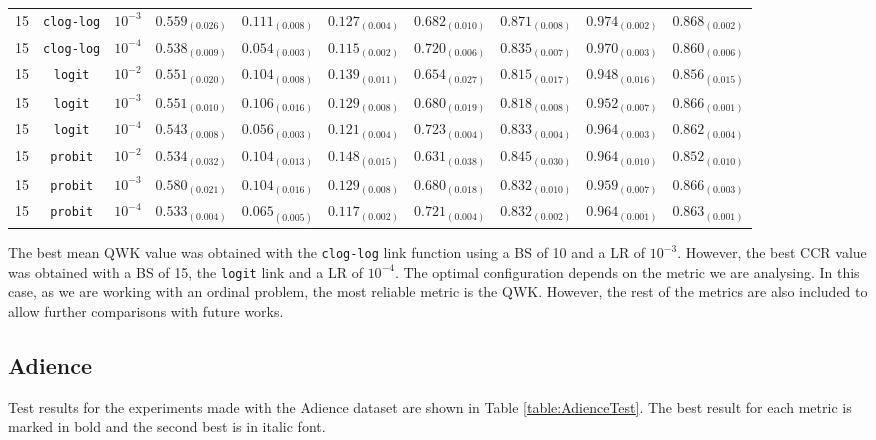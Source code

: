 \documentclass[journal]{IEEEtran}
\begin{document}
\begin{table}[!t]
\begin{tabular}{c@{\hskip 0.15cm}c@{\hskip 0.15cm}c@{\hskip 0.15cm}c@{\hskip 0.30cm}c@{\hskip 0.20cm}c@{\hskip 0.20cm}c@{\hskip 0.20cm}c@{\hskip 0.20cm}c@{\hskip 0.20cm}c}
			15 & \texttt{clog-log} & $10^{-3}$ & $0.559_{(0.026)}$ & $\mathit{0.111_{(0.008)}}$ & $0.127_{(0.004)}$ & $0.682_{(0.010)}$ & $0.871_{(0.008)}$ & $\mathit{0.974_{(0.002)}}$ & $\mathbf{0.868_{(0.002)}}$\\
			15 & \texttt{clog-log} & $10^{-4}$ & $0.538_{(0.009)}$ & $0.054_{(0.003)}$ & $\mathbf{0.115_{(0.002)}}$ & $0.720_{(0.006)}$ & $0.835_{(0.007)}$ & $0.970_{(0.003)}$ & $0.860_{(0.006)}$\\
			15 & \texttt{logit} & $10^{-2}$ & $0.551_{(0.020)}$ & $0.104_{(0.008)}$ & $0.139_{(0.011)}$ & $0.654_{(0.027)}$ & $0.815_{(0.017)}$ & $0.948_{(0.016)}$ & $0.856_{(0.015)}$\\
			15 & \texttt{logit} & $10^{-3}$ & $0.551_{(0.010)}$ & $0.106_{(0.016)}$ & $0.129_{(0.008)}$ & $0.680_{(0.019)}$ & $0.818_{(0.008)}$ & $0.952_{(0.007)}$ & $\mathit{0.866_{(0.001)}}$\\
			15 & \texttt{logit} & $10^{-4}$ & $0.543_{(0.008)}$ & $0.056_{(0.003)}$ & $0.121_{(0.004)}$ & $\mathbf{0.723_{(0.004)}}$ & $0.833_{(0.004)}$ & $0.964_{(0.003)}$ & $0.862_{(0.004)}$\\
			15 & \texttt{probit} & $10^{-2}$ & $0.534_{(0.032)}$ & $0.104_{(0.013)}$ & $0.148_{(0.015)}$ & $0.631_{(0.038)}$ & $0.845_{(0.030)}$ & $0.964_{(0.010)}$ & $0.852_{(0.010)}$\\
			15 & \texttt{probit} & $10^{-3}$ & $\mathit{0.580_{(0.021)}}$ & $0.104_{(0.016)}$ & $0.129_{(0.008)}$ & $0.680_{(0.018)}$ & $0.832_{(0.010)}$ & $0.959_{(0.007)}$ & $0.866_{(0.003)}$\\
			15 & \texttt{probit} & $10^{-4}$ & $0.533_{(0.004)}$ & $0.065_{(0.005)}$ & $0.117_{(0.002)}$ & $\mathit{0.721_{(0.004)}}$ & $0.832_{(0.002)}$ & $0.964_{(0.001)}$ & $0.863_{(0.001)}$\\
			\hline
			\hline
		\end{tabular}
	\end{table}
	
	The best mean QWK value was obtained with the \texttt{clog-log} link function using a BS of 10 and a LR of $10^{-3}$. However, the best CCR value was obtained with a BS of 15, the \texttt{logit} link and a LR of $10^{-4}$. The optimal configuration depends on the metric we are analysing. In this case, as we are working with an ordinal problem, the most reliable metric is the QWK. However, the rest of the metrics are also included to allow further comparisons with future works.
	
	\subsection{Adience}
	\label{sect:adience}
	Test results for the experiments made with the Adience dataset are shown in Table \ref{table:AdienceTest}. The best result for each metric is marked in bold and the second best is in italic font.
	
\end{document}
